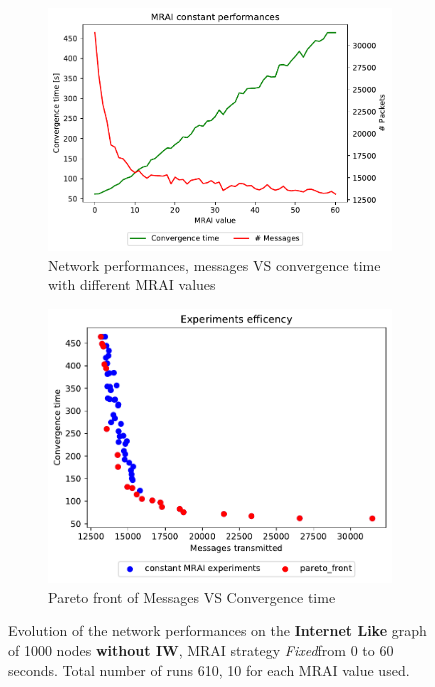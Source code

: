 \begin{figure}[h]
     \centering
     \begin{subfigure}[b]{0.49\textwidth}
         \centering
         \includegraphics[width=\textwidth]{images/internet_like/1000/constantMRAI/internet_like-constant-noIW_mrai_evolution.pdf}
		 \caption{Network performances, messages VS convergence time with different
			\ac{MRAI} values}
         \label{fig:internt_like_1000_constant_noIW_evolution_evolution}
     \end{subfigure}
     \hfill
     \begin{subfigure}[b]{0.49\textwidth}
         \centering
         \includegraphics[width=\textwidth]{images/internet_like/1000/constantMRAI/internet_like-constant-noIW.pdf}
		 \caption{Pareto front of Messages VS Convergence time}
         \label{fig:internt_like_1000_constant_noIW_evolution_paretoFront}
     \end{subfigure}
		\caption{Evolution of the network performances on the \textbf{Internet Like} graph
			of \num{1000} nodes \textbf{without \ac{IW}}, \ac{MRAI} strategy
			\textit{Fixed}from \num{0} to \num{60} seconds. Total number of
			runs \num{610}, \num{10} for each \ac{MRAI} value used.}
        \label{fig:internet_like_1000_constant_evolution_noIW}
\end{figure}

